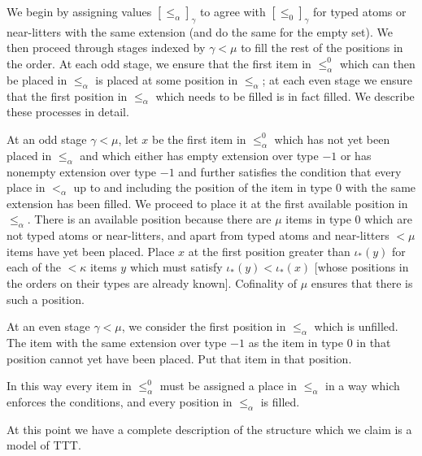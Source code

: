 \documentclass[112pt]{article}
\begin{document}
\begin{description}
We begin by assigning values $[\leq_\alpha]_\gamma$ to agree with $[\leq_0]_\gamma$ for typed atoms or near-litters
with the same extension (and do the same for the empty set).  We then proceed through stages indexed by $\gamma<\mu$ to fill the rest of the positions in the order.  At each odd stage, we ensure that the first item in $\leq^0_\alpha$ which can then be placed in $\leq_\alpha$ is placed
at some position in $\leq_\alpha$;  at each even stage we ensure that the first position in $\leq_\alpha$ which needs to be filled is in fact filled.  We describe these processes in detail.

At an odd stage $\gamma<\mu$,  let $x$ be the first item in $\leq_\alpha^0$ which has not yet been placed in $\leq_\alpha$ and which either has empty extension over type $-1$ or has nonempty extension over type $-1$ and further satisfies the condition that every place in $<_\alpha$ up to and including the position of the item in type 0 with the same extension has been filled.
We proceed to place it at the first available position in $\leq_\alpha$.  There is an available position because there are $\mu$ items in type 0 which are not typed atoms or near-litters, and apart from typed atoms and near-litters $<\mu$ items have yet been placed.  Place $x$ at the first position greater than $\iota_*(y)$ for each of the $<\kappa$ items $y$ which must satisfy
$\iota_*(y)<\iota_*(x)$ [whose positions in the orders on their types are already known].  Cofinality of $\mu$ ensures that there is such a position.

At an even stage $\gamma<\mu$, we consider the first position in $\leq_\alpha$ which is unfilled.  The item with the same extension over type $-1$ as the item in type 0 in that position cannot yet have been placed.  Put that item in that position.

In this way every item in $\leq_\alpha^0$  must be assigned a place in $\leq_\alpha$ in a way which enforces the conditions, and every position in $\leq_\alpha$ is filled.

\begin{comment}

NOTE TO SELF:  write out the back and forth argument in more detail for communication with Sky

\end{comment}

At this point we have a complete description of the structure which we claim is a model of TTT.


\end{description}
\end{document}
